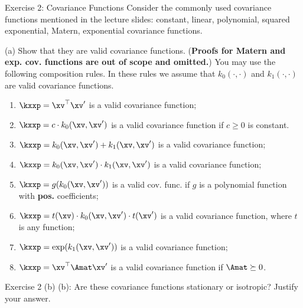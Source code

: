 \documentclass[aspectratio=169]{beamer}
\newcommand{\xvp}{\xv^\prime}
\newcommand{\kz}{k_0}
\newcommand{\ko}{k_1}
\newcommand{\kzxxp}{\kz(\xv, \xvp)}
\newcommand{\koxxp}{\ko(\xv, \xvp)}
\begin{document}
\begin{frame}{Exercise 2: Covariance Functions}
	\small
	Consider the commonly used covariance functions mentioned in the lecture slides: constant, linear, polynomial, squared exponential, Matern, exponential covariance functions.
	\vspace{1em}

	(a) Show that they are valid covariance functions. (\textbf{Proofs for Matern and exp. cov. functions are out of scope and omitted.}) You may use the following composition rules. In these rules we assume that $k_0(\cdot, \cdot)$ and $k_1(\cdot, \cdot)$ are valid covariance functions.
	\begin{enumerate}
		\item $\kxxp = \xv^\top \xvp$ is a valid covariance function;
		\item $\kxxp = c \cdot \kzxxp$ is a valid covariance function if $c \geq 0$ is constant.
		\item $\kxxp = \kzxxp + \koxxp$ is a valid covariance function;
		\item $\kxxp = \kzxxp \cdot \koxxp$ is a valid covariance function;
		\item $\kxxp = g(\kzxxp)$ is a valid cov. func. if $g$ is a polynomial function with \textbf{pos.} coefficients;
		\item $\kxxp = t(\xv) \cdot \kzxxp \cdot t(\xvp)$ is a valid covariance function, where $t$ is any function;
		\item $\kxxp = \exp(\koxxp)$ is a valid covariance function;
		\item $\kxxp = \xv^\top \Amat \xvp$ is a valid covariance function if $\Amat \succeq 0$.
	\end{enumerate}
\end{frame}

\begin{frame}{Exercise 2 (b)}
	(b): Are these covariance functions stationary or isotropic? Justify your answer.
\end{frame}
\end{document}
